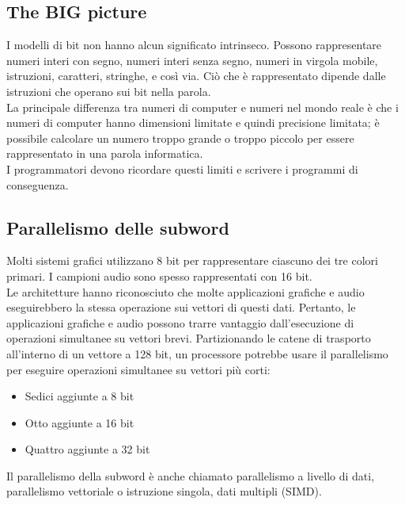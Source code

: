 \documentclass[12pt,a4paper]{article}
\begin{document}
\subsection{The BIG picture}
I modelli di bit non hanno alcun significato intrinseco. Possono rappresentare numeri interi con segno, numeri interi senza segno, numeri in virgola mobile, istruzioni, caratteri, stringhe, e così via.
Ciò che è rappresentato dipende dalle istruzioni che operano sui bit nella parola.\\
La principale differenza tra numeri di computer e numeri nel mondo reale è che i numeri di computer hanno dimensioni limitate e quindi precisione limitata; è possibile calcolare un numero troppo grande o troppo piccolo per essere rappresentato in una parola informatica.\\
I programmatori devono ricordare questi limiti e scrivere i programmi di conseguenza.

\subsection{Parallelismo delle subword}
Molti sistemi grafici utilizzano 8 bit per rappresentare ciascuno dei tre colori primari. I campioni audio sono spesso rappresentati con 16 bit.\\
Le architetture hanno riconosciuto che molte applicazioni grafiche e audio eseguirebbero la stessa operazione sui vettori di questi dati. Pertanto, le applicazioni grafiche e audio possono trarre vantaggio dall'esecuzione di operazioni simultanee su vettori brevi. Partizionando le catene di trasporto all'interno di un vettore a 128 bit, un processore potrebbe usare il parallelismo per eseguire operazioni simultanee su vettori più corti:
\begin{itemize}
\item Sedici aggiunte a 8 bit
\item Otto aggiunte a 16 bit
\item Quattro aggiunte a 32 bit
\end{itemize}
Il parallelismo della subword è anche chiamato parallelismo a livello di dati, parallelismo vettoriale o istruzione singola, dati multipli (SIMD).
\end{document}
